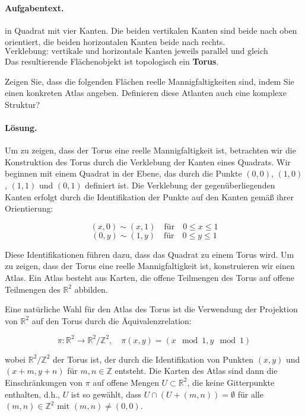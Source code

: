 \documentclass[11pt,a4paper]{article}
\begin{document}
\paragraph{Aufgabentext.}
in Quadrat mit vier Kanten. 
Die beiden vertikalen Kanten sind beide nach oben orientiert, 
die beiden horizontalen Kanten beide nach rechts.  
\[
\text{Verklebung: vertikale und horizontale Kanten jeweils parallel und gleich orientiert.}
\]
Das resultierende Flächenobjekt ist topologisch ein \textbf{Torus}.

Zeigen Sie, dass die folgenden Flächen reelle Mannigfaltigkeiten sind, indem Sie einen konkreten Atlas angeben. Definieren diese Atlanten auch eine komplexe Struktur?

\paragraph{Lösung.}
Um zu zeigen, dass der Torus eine reelle Mannigfaltigkeit ist, betrachten wir die Konstruktion des Torus durch die Verklebung der Kanten eines Quadrats. Wir beginnen mit einem Quadrat in der Ebene, das durch die Punkte \( (0,0) \), \( (1,0) \), \( (1,1) \) und \( (0,1) \) definiert ist. Die Verklebung der gegenüberliegenden Kanten erfolgt durch die Identifikation der Punkte auf den Kanten gemäß ihrer Orientierung:

\[
(x,0) \sim (x,1) \quad \text{für} \quad 0 \leq x \leq 1
\]
\[
(0,y) \sim (1,y) \quad \text{für} \quad 0 \leq y \leq 1
\]

Diese Identifikationen führen dazu, dass das Quadrat zu einem Torus wird. Um zu zeigen, dass der Torus eine reelle Mannigfaltigkeit ist, konstruieren wir einen Atlas. Ein Atlas besteht aus Karten, die offene Teilmengen des Torus auf offene Teilmengen des \(\mathbb{R}^2\) abbilden.

Eine natürliche Wahl für den Atlas des Torus ist die Verwendung der Projektion von \(\mathbb{R}^2\) auf den Torus durch die Äquivalenzrelation:

\[
\pi: \mathbb{R}^2 \to \mathbb{R}^2 / \mathbb{Z}^2, \quad \pi(x,y) = (x \mod 1, y \mod 1)
\]

wobei \(\mathbb{R}^2 / \mathbb{Z}^2\) der Torus ist, der durch die Identifikation von Punkten \((x,y)\) und \((x+m, y+n)\) für \(m, n \in \mathbb{Z}\) entsteht. Die Karten des Atlas sind dann die Einschränkungen von \(\pi\) auf offene Mengen \(U \subset \mathbb{R}^2\), die keine Gitterpunkte enthalten, d.h., \(U\) ist so gewählt, dass \(U \cap (U + (m,n)) = \emptyset\) für alle \((m,n) \in \mathbb{Z}^2\) mit \((m,n) \neq (0,0)\).
\end{document}

